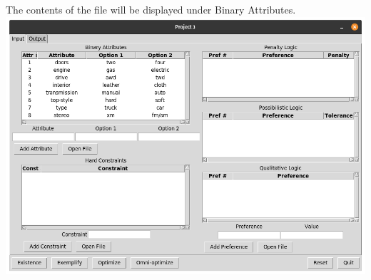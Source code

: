 \documentclass[12pt]{report}
\begin{document}
The contents of the file will be displayed under Binary Attributes.\\
\includegraphics[scale=0.3]{attributes_imported}
\newpage
\end{document}
